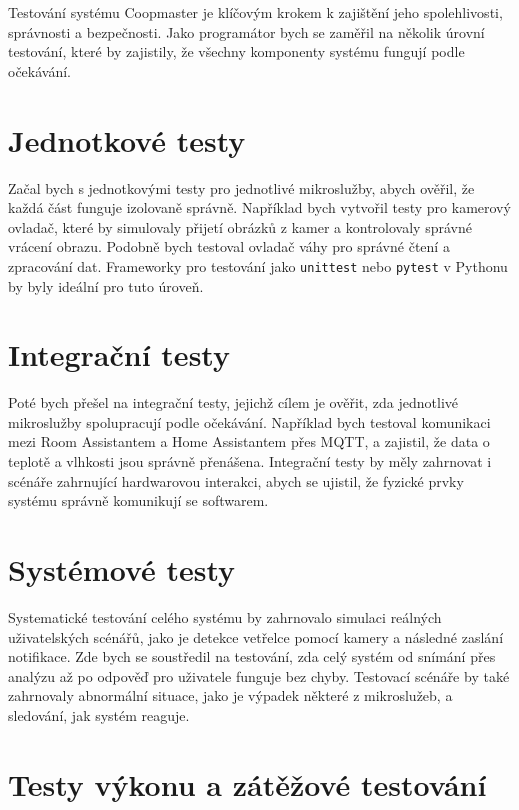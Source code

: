 Testování systému Coopmaster je klíčovým krokem k zajištění jeho spolehlivosti, správnosti a bezpečnosti.
Jako programátor bych se zaměřil na několik úrovní testování, které by zajistily, že všechny komponenty systému fungují podle očekávání.

\section{Jednotkové testy}\label{sec:jednotkove-testy}

Začal bych s jednotkovými testy pro jednotlivé mikroslužby, abych ověřil, že každá část funguje izolovaně správně.
Například bych vytvořil testy pro kamerový ovladač, které by simulovaly přijetí obrázků z kamer a kontrolovaly správné vrácení obrazu.
Podobně bych testoval ovladač váhy pro správné čtení a zpracování dat.
Frameworky pro testování jako \texttt{unittest} nebo \texttt{pytest} v Pythonu by byly ideální pro tuto úroveň.

\section{Integrační testy}\label{sec:integracni-testy}

Poté bych přešel na integrační testy, jejichž cílem je ověřit, zda jednotlivé mikroslužby spolupracují podle očekávání.
Například bych testoval komunikaci mezi Room Assistantem a Home Assistantem přes MQTT, a zajistil, že data o teplotě a vlhkosti jsou správně přenášena.
Integrační testy by měly zahrnovat i scénáře zahrnující hardwarovou interakci, abych se ujistil, že fyzické prvky systému správně komunikují se softwarem.

\section{Systémové testy}\label{sec:systemove-testy}

Systematické testování celého systému by zahrnovalo simulaci reálných uživatelských scénářů, jako je detekce vetřelce pomocí kamery a následné zaslání notifikace.
Zde bych se soustředil na testování, zda celý systém od snímání přes analýzu až po odpověď pro uživatele funguje bez chyby.
Testovací scénáře by také zahrnovaly abnormální situace, jako je výpadek některé z mikroslužeb, a sledování, jak systém reaguje.

\section{Testy výkonu a zátěžové testování}\label{sec:testy-vykonu-a-zatezove-testovani}

